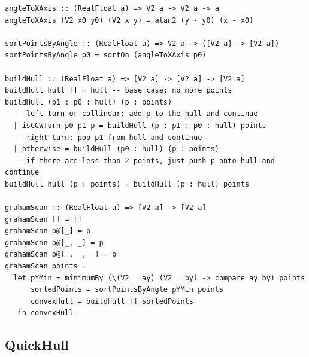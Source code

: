 \documentclass[12pt]{article}
\begin{document}
  \begin{verbatim}
angleToXAxis :: (RealFloat a) => V2 a -> V2 a -> a
angleToXAxis (V2 x0 y0) (V2 x y) = atan2 (y - y0) (x - x0)

sortPointsByAngle :: (RealFloat a) => V2 a -> ([V2 a] -> [V2 a])
sortPointsByAngle p0 = sortOn (angleToXAxis p0)

buildHull :: (RealFloat a) => [V2 a] -> [V2 a] -> [V2 a]
buildHull hull [] = hull -- base case: no more points
buildHull (p1 : p0 : hull) (p : points)
  -- left turn or collinear: add p to the hull and continue
  | isCCWTurn p0 p1 p = buildHull (p : p1 : p0 : hull) points
  -- right turn: pop p1 from hull and continue
  | otherwise = buildHull (p0 : hull) (p : points)
  -- if there are less than 2 points, just push p onto hull and continue
buildHull hull (p : points) = buildHull (p : hull) points

grahamScan :: (RealFloat a) => [V2 a] -> [V2 a]
grahamScan [] = []
grahamScan p@[_] = p
grahamScan p@[_, _] = p
grahamScan p@[_, _, _] = p
grahamScan points =
  let pYMin = minimumBy (\(V2 _ ay) (V2 _ by) -> compare ay by) points
      sortedPoints = sortPointsByAngle pYMin points
      convexHull = buildHull [] sortedPoints
   in convexHull
  \end{verbatim}

  \subsection*{QuickHull}
\end{document}
